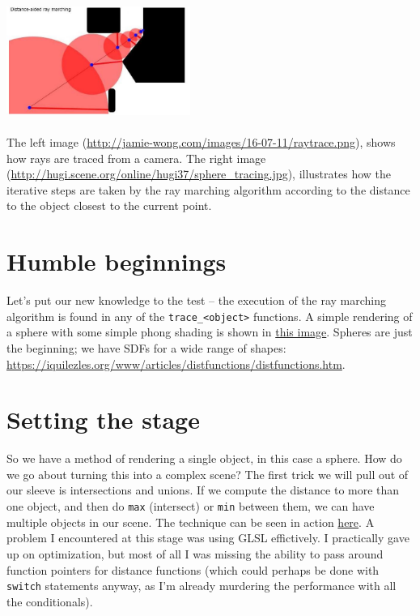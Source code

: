 \documentclass[abstract=off,oneside]{scrreprt}
\begin{document}
\includegraphics[width=0.45\textwidth]{./img/sphere_tracing.jpg}
\\\\
The left image (\url{http://jamie-wong.com/images/16-07-11/raytrace.png}),
shows how rays are traced from a camera. The right image
(\url{http://hugi.scene.org/online/hugi37/sphere_tracing.jpg}), illustrates
how the iterative steps are taken by the ray marching algorithm
according to the distance to the object closest to the current point.

\section*{Humble beginnings}
\label{sec-4}
\label{sec:beginnings}
Let's put our new knowledge to the test -- the execution of the ray
marching algorithm is found in any of the \verb~trace_<object>~
functions. A simple rendering of a sphere with some simple phong
shading is shown in \hyperref[fig:simplesphere]{this image}. Spheres are just the beginning; we
have SDFs for a wide range of shapes:
\url{https://iquilezles.org/www/articles/distfunctions/distfunctions.htm}.

\section*{Setting the stage}
\label{sec-5}
\label{sec:creatingascene}
So we have a method of rendering a single object, in this case a
sphere. How do we go about turning this into a complex scene? The
first trick we will pull out of our sleeve is intersections and
unions. If we compute the distance to more than one object, and then
do \verb~max~ (intersect) or \verb~min~ between them, we can have multiple
objects in our scene. The technique can be seen in action \hyperref[fig:union]{here}. A
problem I encountered at this stage was using GLSL effictively. I
practically gave up on optimization, but most of all I was missing the
ability to pass around function pointers for distance functions (which
could perhaps be done with \verb~switch~ statements anyway, as I'm already
murdering the performance with all the conditionals).
\end{document}
